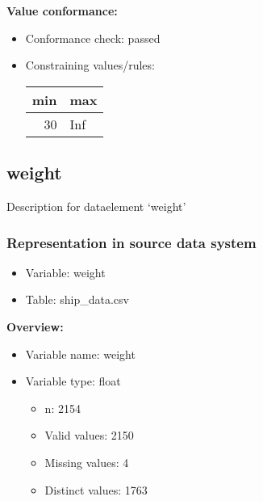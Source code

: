 \documentclass[
]{article}
\providecommand{\tightlist}{%
  \setlength{\itemsep}{0pt}\setlength{\parskip}{0pt}}
\begin{document}
\textbf{Value conformance:}

\begin{itemize}
\tightlist
\item
  Conformance check: passed
\item
  Constraining values/rules:

  \begin{table}[H]
  \centering
  \begin{tabular}{r|l}
  \hline
  \textbf{min} & \textbf{max}\\
  \hline
  30 & Inf\\
  \hline
  \end{tabular}
  \end{table}
\end{itemize}

\newpage

\hypertarget{weight}{%
\subsection{weight}\label{weight}}

Description for dataelement `weight'

\hypertarget{representation-in-source-data-system-28}{%
\subsubsection{\texorpdfstring{Representation in \textbf{source} data
system}{Representation in source data system}}\label{representation-in-source-data-system-28}}

\begin{itemize}
\tightlist
\item
  Variable: weight
\item
  Table: ship\_data.csv
\end{itemize}

\textbf{Overview:}

\begin{itemize}
\tightlist
\item
  Variable name: weight
\item
  Variable type: float

  \begin{itemize}
  \tightlist
  \item
    n: 2154
  \item
    Valid values: 2150
  \item
    Missing values: 4
  \item
    Distinct values: 1763
  \end{itemize}
\end{itemize}
\end{document}
